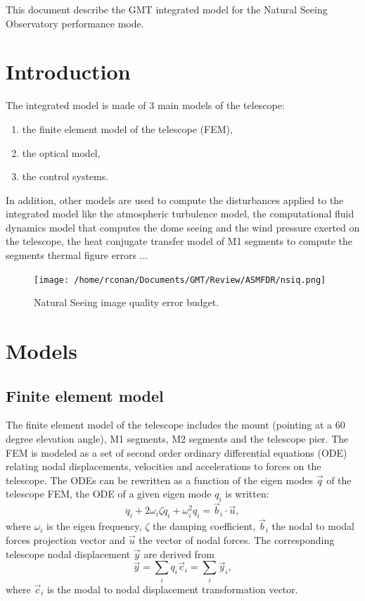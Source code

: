 \documentclass{gmto}
\begin{document}
This document describe the GMT integrated model for the Natural Seeing
Observatory performance mode\cite{ORD}.

\section{Introduction}
\label{sec:introduction}

The integrated model is made of 3 main models of the telescope:
\begin{enumerate}
\item the finite element model of the telescope (FEM),
\item the optical model,
\item the control systems.
\end{enumerate}

In addition, other models are used to compute the disturbances applied to the
integrated model like the atmospheric turbulence model, the computational fluid
dynamics model that computes the dome seeing and the wind pressure exerted on
the telescope, the heat conjugate transfer model of M1 segments to compute the
segments thermal figure errors ...

\begin{figure}
  \centering
  \texttt{[image: /home/rconan/Documents/GMT/Review/ASMFDR/nsiq.png]}
  \caption{Natural Seeing image quality error budget.}
  \label{fig:ns-iq}
\end{figure}

\clearpage
\section{Models}
\label{sec:models}

\subsection{Finite element model}

The finite element model of the telescope\cite{ss2fem_Christoph2020} includes
the mount\cite{mount_pdr_iv} (pointing at a 60 degree elevation angle), M1 segments, M2
segments and the telescope pier.
The FEM is modeled as a set of second order ordinary differential
equations (ODE) relating nodal displacements, velocities and accelerations to
forces on the telescope.
The ODEs can be rewritten as a function of the eigen modes $\vec q$ of the telescope
FEM, the ODE of a given eigen mode $q_i$ is written:
\begin{equation}
  \label{eq:1}
  \ddot q_i + 2\omega_i\zeta\dot q_i + \omega_i^2 q_i = \vec b_i\cdot \vec u,
\end{equation}
where $\omega_i$ is the eigen frequency, $\zeta$ the damping coefficient, $\vec b_i$
the nodal to modal forces projection vector and $\vec u$ the vector of nodal forces.
The corresponding telescope nodal displacement $\vec y$ are derived from
\begin{equation}
  \label{eq:2}
  \vec y = \sum_i q_i\vec c_i  = \sum_i \vec y_i,
\end{equation}
where $\vec c_i$ is the modal to nodal displacement transformation vector.
\end{document}
